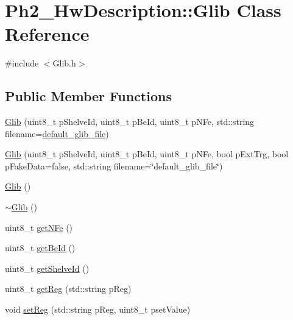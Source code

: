 \hypertarget{class_ph2___hw_description_1_1_glib}{\section{Ph2\-\_\-\-Hw\-Description\-:\-:Glib Class Reference}
\label{class_ph2___hw_description_1_1_glib}
}


{\ttfamily \#include $<$Glib.\-h$>$}

\subsection*{Public Member Functions}
\begin{DoxyCompactItemize}
\item 
\hyperlink{class_ph2___hw_description_1_1_glib_ac63dbf3825526283c7cefc5e217e1c38}{Glib} (uint8\-\_\-t p\-Shelve\-Id, uint8\-\_\-t p\-Be\-Id, uint8\-\_\-t p\-N\-Fe, std\-::string filename=\hyperlink{_glib_8h_a3b2796757992a47db4ed9462093d6fe3}{default\-\_\-glib\-\_\-file})
\item 
\hyperlink{class_ph2___hw_description_1_1_glib_a05a22fe40ace0d74f5493cbded54bd99}{Glib} (uint8\-\_\-t p\-Shelve\-Id, uint8\-\_\-t p\-Be\-Id, uint8\-\_\-t p\-N\-Fe, bool p\-Ext\-Trg, bool p\-Fake\-Data=false, std\-::string filename=\char`\"{}default\-\_\-glib\-\_\-file\char`\"{})
\item 
\hyperlink{class_ph2___hw_description_1_1_glib_a2d9eece9012cdc452f43895852693329}{Glib} ()
\item 
\hyperlink{class_ph2___hw_description_1_1_glib_a2fa668cf8b827199d63be060616a70cd}{$\sim$\-Glib} ()
\item 
uint8\-\_\-t \hyperlink{class_ph2___hw_description_1_1_glib_a2675c993dad690792592ba3e30036bab}{get\-N\-Fe} ()
\item 
uint8\-\_\-t \hyperlink{class_ph2___hw_description_1_1_glib_a27f5e85e68f25e56d1096306e3f70188}{get\-Be\-Id} ()
\item 
uint8\-\_\-t \hyperlink{class_ph2___hw_description_1_1_glib_ac3130c4a08d624c6d89fc66474efd6d8}{get\-Shelve\-Id} ()
\item 
uint8\-\_\-t \hyperlink{class_ph2___hw_description_1_1_glib_ade845c9d6a9fcaaac1766cf89592fb97}{get\-Reg} (std\-::string p\-Reg)
\item 
void \hyperlink{class_ph2___hw_description_1_1_glib_a017ab68372401fe244b912a5297b0c33}{set\-Reg} (std\-::string p\-Reg, uint8\-\_\-t pset\-Value)
\item 

\end{DoxyCompactItemize}

